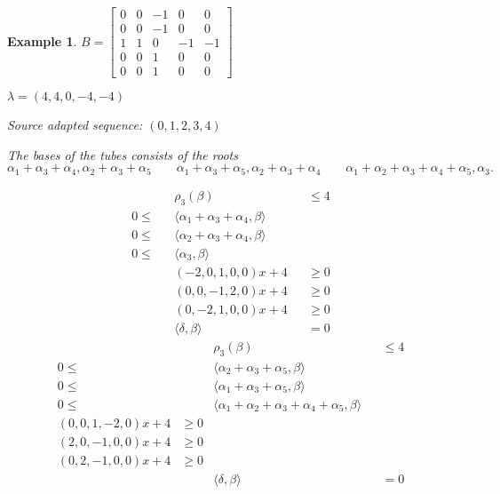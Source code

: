 \documentclass{amsart}
\newtheorem{example}[theorem]{Example}
\numberwithin{theorem}{section}
\begin{document}
\begin{example}
  $B = \left[\begin{array}{ccccc} 0 & 0 & -1 & 0 & 0\\ 0 & 0 & -1 & 0 & 0\\ 1 & 1 & 0 & -1 & -1\\ 0 & 0 & 1 & 0 & 0\\ 0 & 0 & 1 & 0 & 0\end{array}\right]$

  $\lambda = (4,4,0,-4,-4)$

  Source adapted sequence: $(0,1,2,3,4)$

  The bases of the tubes consists of the roots 
  \[\alpha_1+\alpha_3+\alpha_4,\alpha_2+\alpha_3+\alpha_5 \qquad \alpha_1+\alpha_3+\alpha_5,\alpha_2+\alpha_3+\alpha_4 \qquad \alpha_1+\alpha_2+\alpha_3+\alpha_4+\alpha_5,\alpha_3.\]

  \begin{align*}
    && \rho_3(\beta) &&\leq 4\\
    0 \leq && \langle \alpha_1+\alpha_3+\alpha_4, \beta \rangle &&\\
    0 \leq && \langle \alpha_2+\alpha_3+\alpha_4, \beta \rangle &&\\
    0 \leq && \langle \alpha_3, \beta \rangle &&\\
    && (-2, 0, 1, 0, 0) x + 4 &&\geq 0\\
    && (0, 0, -1, 2, 0) x + 4 &&\geq 0\\
    && (0, -2, 1, 0, 0) x + 4 &&\geq 0\\
    && \langle \delta,\beta \rangle &&= 0
  \end{align*}
  \begin{align*}
    && \rho_3(\beta) &&\leq 4\\
    0 \leq && \langle \alpha_2+\alpha_3+\alpha_5, \beta \rangle &&\\
    0 \leq && \langle \alpha_1+\alpha_3+\alpha_5, \beta \rangle &&\\
    0 \leq && \langle \alpha_1+\alpha_2+\alpha_3+\alpha_4+\alpha_5, \beta \rangle &&\\
    (0, 0, 1, -2, 0) x + 4 &\geq 0\\
    (2, 0, -1, 0, 0) x + 4 &\geq 0\\
    (0, 2, -1, 0, 0) x + 4 &\geq 0\\
    && \langle \delta,\beta \rangle &&= 0
  \end{align*}
\end{example}
\end{document}
